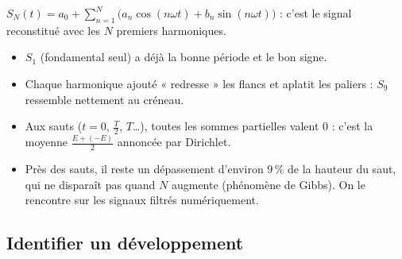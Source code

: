\documentclass[a4paper,11pt]{article}
\begin{document}
\begin{definition}
$S_N(t) = a_0 + \displaystyle\sum_{n=1}^{N}\big(a_n\cos(n\omega t) + b_n\sin(n\omega t)\big)$ : c'est le signal reconstitué avec les $N$ premiers harmoniques.
\end{definition}

\begin{center}
\end{center}

\begin{exemple}\label{ex:gibbs}
\begin{itemize}
  \item $S_1$ (fondamental seul) a déjà la bonne période et le bon signe.
  \item Chaque harmonique ajouté « redresse » les flancs et aplatit les paliers : $S_9$ ressemble nettement au créneau.
  \item Aux sauts ($t = 0$, $\frac T2$, $T$\dots), toutes les sommes partielles valent $0$ : c'est la moyenne $\frac{E + (-E)}{2}$ annoncée par Dirichlet.
  \item Près des sauts, il reste un dépassement d'environ $9\,\%$ de la hauteur du saut, qui ne disparaît pas quand $N$ augmente (phénomène de Gibbs). On le rencontre sur les signaux filtrés numériquement.
\end{itemize}
\end{exemple}

\subsection{Identifier un développement}\label{subsec:identifier}
\end{document}

